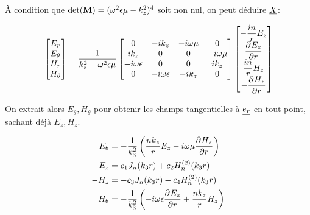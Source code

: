     À condition que $\det(\mat{M}) = (\w^2\eps\mu-k_z^2)^4$ soit non nul, on peut déduire $\v{X}$:

    \begin{equation}
        \begin{bmatrix}
            E_r\\
            E_\theta\\
            H_r\\
            H_\theta
        \end{bmatrix} =
        \frac{1}{k_z^2 - \w^2\eps\mu}
        \begin{bmatrix}
        0 & -ik_z & -i\w\mu & 0 
        \\
        ik_z & 0 & 0 & -i\w\mu
        \\
        -i\w\eps & 0 & 0 & ik_z
        \\
        0 & -i\w\eps & -ik_z & 0
        \end{bmatrix}
        \begin{bmatrix}
            -\frac{in}{r}E_z\\
            \ddr{r}{E_z}\\
            \frac{in}{r}H_z\\
            -\ddr{r}{H_z}
        \end{bmatrix}
    \end{equation}

    On extrait alors $E_\theta, H_\theta$ pour obtenir les champs tangentielles à $\v{e_r}$ en tout point, sachant déjà $E_z, H_z$.

    \begin{align}
        E_\theta &= -\frac{1}{k_3^2}\left(\frac{nk_z}{r}E_z - i\w\mu\ddr{r}{H_z}\right)
        \\
        E_z &= c_1 J_n(k_3 r) + c_2 H_n^{(2)}(k_3 r)
        \\
        -H_z &= -c_3 J_n(k_3 r) - c_4 H_n^{(2)}(k_3 r)
        \\
        H_\theta &= -\frac{1}{k_3^2}\left(-i\w\eps\ddr{r}{E_z} + \frac{nk_z}{r}H_z\right)
    \end{align}

